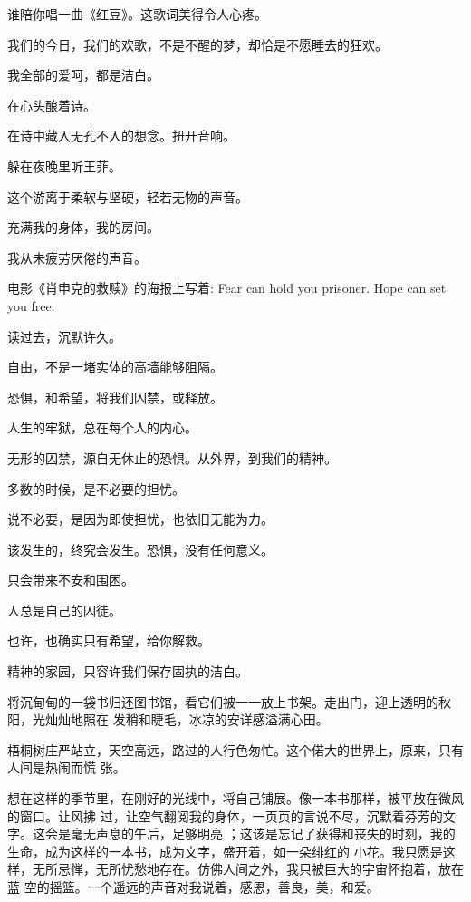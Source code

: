 \documentclass[12pt,a4paper]{article}
\begin{document}
		谁陪你唱一曲《红豆》。这歌词美得令人心疼。\par
		我们的今日，我们的欢歌，不是不醒的梦，却恰是不愿睡去的狂欢。\par
		我全部的爱呵，都是洁白。\par
		在心头酿着诗。\par
		在诗中藏入无孔不入的想念。扭开音响。\par
		躲在夜晚里听王菲。\par
		这个游离于柔软与坚硬，轻若无物的声音。\par
		充满我的身体，我的房间。

		我从未疲劳厌倦的声音。

	\endwriting



		电影《肖申克的救赎》的海报上写着: Fear can hold you prisoner. Hope can set you free.

		读过去，沉默许久。

		自由，不是一堵实体的高墙能够阻隔。

		恐惧，和希望，将我们囚禁，或释放。

		人生的牢狱，总在每个人的内心。

		无形的囚禁，源自无休止的恐惧。从外界，到我们的精神。

		多数的时候，是不必要的担忧。

		说不必要，是因为即使担忧，也依旧无能为力。

		该发生的，终究会发生。恐惧，没有任何意义。

		只会带来不安和围困。

		人总是自己的囚徒。

		也许，也确实只有希望，给你解救。

	\endwriting



		精神的家园，只容许我们保存固执的洁白。

		将沉甸甸的一袋书归还图书馆，看它们被一一放上书架。走出门，迎上透明的秋阳，光灿灿地照在
	发稍和睫毛，冰凉的安详感溢满心田。

		梧桐树庄严站立，天空高远，路过的人行色匆忙。这个偌大的世界上，原来，只有人间是热闹而慌
	张。

		想在这样的季节里，在刚好的光线中，将自己铺展。像一本书那样，被平放在微风的窗口。让风拂
	过，让空气翻阅我的身体，一页页的言说不尽，沉默着芬芳的文字。这会是毫无声息的午后，足够明亮
	；这该是忘记了获得和丧失的时刻，我的生命，成为这样的一本书，成为文字，盛开着，如一朵绯红的
	小花。我只愿是这样，无所忌惮，无所忧愁地存在。仿佛人间之外，我只被巨大的宇宙怀抱着，放在蓝
	空的摇篮。一个遥远的声音对我说着，感恩，善良，美，和爱。
\end{document}
